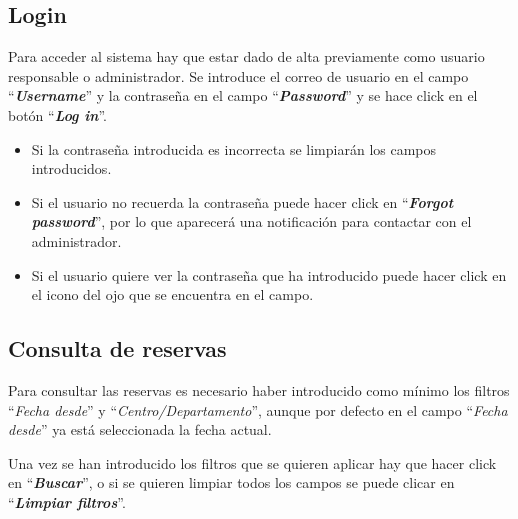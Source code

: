 
\subsection{Login}
Para acceder al sistema hay que estar dado de alta previamente como usuario responsable o administrador.
Se introduce el correo de usuario en el campo ``\textbf{\textit{Username}}'' y la contraseña en el campo ``\textbf{\textit{Password}}'' y se hace click en el botón ``\textbf{\textit{Log in}}''.

\begin{itemize}
    \item Si la contraseña introducida es incorrecta se limpiarán los campos introducidos.
    \item Si el usuario no recuerda la contraseña puede hacer click en ``\textbf{\textit{Forgot password}}'', por lo que aparecerá una notificación para contactar con el administrador.
    
    
    \item Si el usuario quiere ver la contraseña que ha introducido puede hacer click en el icono del ojo que se encuentra en el campo.
\end{itemize}


\subsection{Consulta de reservas}
Para consultar las reservas es necesario haber introducido como mínimo los filtros ``\textit{Fecha desde}'' y ``\textit{Centro/Departamento}'', aunque por defecto en el campo ``\textit{Fecha desde}'' ya está seleccionada la fecha actual. 


Una vez se han introducido los filtros que se quieren aplicar hay que hacer click en ``\textbf{\textit{Buscar}}'', o si se quieren limpiar todos los campos se puede clicar en ``\textbf{\textit{Limpiar filtros}}''.

